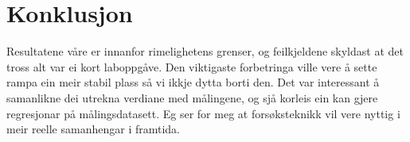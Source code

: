 \documentclass[12pt,a4paper]{article}
\begin{document}
  \section{Konklusjon}
  Resultatene våre er innanfor rimelighetens grenser, og feilkjeldene skyldast
  at det tross alt var ei kort laboppgåve. Den viktigaste forbetringa ville
  vere å sette rampa ein meir stabil plass så vi ikkje dytta borti den. Det var
  interessant å samanlikne dei utrekna verdiane med målingene, og sjå korleis
  ein kan gjere regresjonar på målingsdatasett. Eg ser for meg at
  forsøksteknikk vil vere nyttig i meir reelle samanhengar i framtida.
\end{document}
